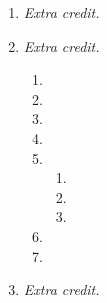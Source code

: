 \documentclass[11pt]{article}
\begin{document}
\begin{enumerate}
\begin{enumerate}[label=(\alph*)]
	\end{enumerate}
\item %
	\textit{Extra credit.}
\item %
	\textit{Extra credit.}
	\begin{enumerate}[label=(\alph*)]
	\item
	\item
	\item
	\item
	\item
		\begin{enumerate}[label=\roman*.]
		\item
		\item
		\item
		\end{enumerate}
	\item
	\item
	\end{enumerate}
\item %
	\textit{Extra credit.}

\end{enumerate}
\end{document}
